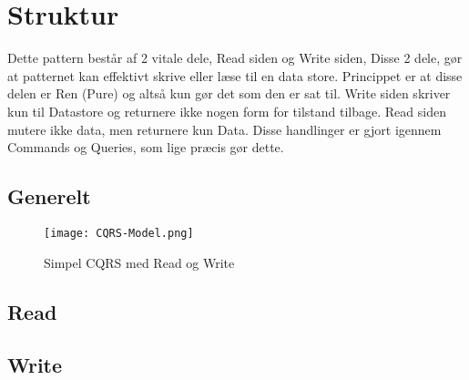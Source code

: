 \section{Struktur}

Dette pattern består af 2 vitale dele, Read siden og Write siden, Disse 2 dele, gør at patternet kan effektivt skrive eller læse til en data store. Princippet er at disse delen er Ren (Pure) og altså kun gør det som den er sat til. Write siden skriver kun til Datastore og returnere ikke nogen form for tilstand tilbage. Read siden mutere ikke data, men returnere kun Data. Disse handlinger er gjort igennem Commands og Queries, som lige præcis gør dette. 

\subsection{Generelt}

\begin{figure}[H]
	\center
	\texttt{[image: CQRS-Model.png]}
	\caption{Simpel CQRS med Read og Write}
	\label{fig:cqrs-model}
\end{figure}

\subsection{Read}


\subsection{Write}

